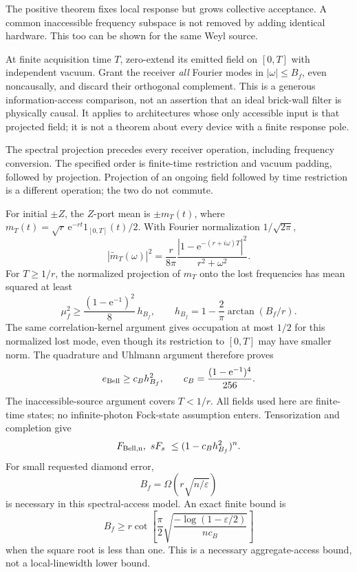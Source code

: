 \documentclass[11pt,a4paper]{article}
\newcommand{\ee}{\mathrm e}
\begin{document}
The positive theorem fixes local response but grows collective acceptance. A common inaccessible frequency subspace is not removed by adding identical hardware. This too can be shown for the same Weyl source.

At finite acquisition time $T$, zero-extend its emitted field on $[0,T]$ with independent vacuum. Grant the receiver \emph{all} Fourier modes in $|\omega|\le B_f$, even noncausally, and discard their orthogonal complement. This is a generous information-access comparison, not an assertion that an ideal brick-wall filter is physically causal. It applies to architectures whose only accessible input is that projected field; it is not a theorem about every device with a finite response pole.

The spectral projection precedes every receiver operation, including frequency conversion. The specified order is finite-time restriction and vacuum padding, followed by projection. Projection of an ongoing field followed by time restriction is a different operation; the two do not commute.

For initial $\pm Z$, the $Z$-port mean is $\pm m_T(t)$, where $m_T(t)=\sqrt r\,\ee^{-rt}1_{[0,T]}(t)/2$. With Fourier normalization $1/\sqrt{2\pi}$,
\begin{equation}
 |\widetilde m_T(\omega)|^2
 =\frac{r}{8\pi}\frac{|1-\ee^{-(r+i\omega)T}|^2}{r^2+\omega^2}.
\end{equation}
For $T\ge1/r$, the normalized projection of $m_T$ onto the lost frequencies has mean squared at least
\begin{equation}
 \mu_f^2\ge\frac{(1-\ee^{-1})^2}{8}\,h_{B_f},\qquad
 h_{B_f}=1-\frac2\pi\arctan(B_f/r).
\end{equation}
The same correlation-kernel argument gives occupation at most $1/2$ for this normalized lost mode, even though its restriction to $[0,T]$ may have smaller norm. The quadrature and Uhlmann argument therefore proves
\begin{equation}
 e_{\rm Bell}\ge c_Bh_{B_f}^2,\qquad c_B=\frac{(1-\ee^{-1})^4}{256}.
\end{equation}
The inaccessible-source argument covers $T<1/r$. All fields used here are finite-time states; no infinite-photon Fock-state assumption enters. Tensorization and completion give
\begin{equation}
 F_{\rm Bell,n},\ sF_s\ \le(1-c_Bh_{B_f}^2)^n.
\end{equation}
For small requested diamond error,
\begin{equation}
 B_f=\Omega\!\left(r\sqrt{n/\varepsilon}\right)
\end{equation}
is necessary in this spectral-access model. An exact finite bound is
\begin{equation}
 B_f\ge r\cot\!\left[\frac\pi2
 \sqrt{\frac{-\log(1-\varepsilon/2)}{nc_B}}\right]
\end{equation}
when the square root is less than one. This is a necessary aggregate-access bound, not a local-linewidth lower bound.
\end{document}
